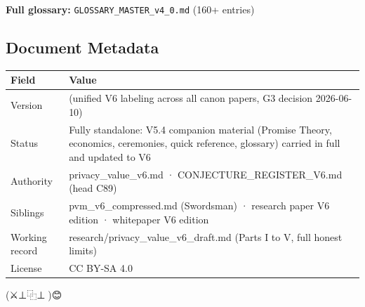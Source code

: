 \documentclass[
]{article}
\newcounter{none} %
\begin{document}
\textbf{Full glossary:} \texttt{GLOSSARY\_MASTER\_v4\_0.md} (160+
entries)

\subsection{Document Metadata}\label{document-metadata}

{\def\LTcaptype{none} %
\begin{longtable}[]{@{}
  >{\raggedright\arraybackslash}p{}
  >{\raggedright\arraybackslash}p{}@{}}
\toprule\noalign{}
\begin{minipage}[b]{\linewidth}\raggedright
Field
\end{minipage} & \begin{minipage}[b]{\linewidth}\raggedright
Value
\end{minipage} \\
\midrule\noalign{}
\endhead
\bottomrule\noalign{}
\endlastfoot
Version & 6.0 (unified V6 labeling across all canon papers, G3 decision
2026-06-10) \\
Status & Fully standalone: V5.4 companion material (Promise Theory,
economics, ceremonies, quick reference, glossary) carried in full and
updated to V6 \\
Authority & privacy\_value\_v6.md · CONJECTURE\_REGISTER\_V6.md (head
C89) \\
Siblings & pvm\_v6\_compressed.md (Swordsman) · research paper V6
edition · whitepaper V6 edition \\
Working record & research/privacy\_value\_v6\_draft.md (Parts I to V,
full honest limits) \\
License & CC BY-SA 4.0 \\
\end{longtable}
}

(⚔️⊥⿻⊥🧙)😊
\end{document}
